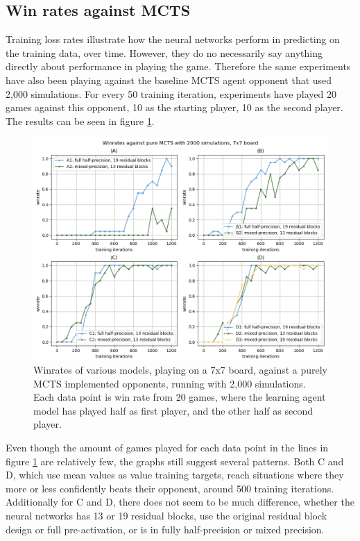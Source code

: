 \subsection{Win rates against MCTS}
Training loss rates illustrate how the neural networks perform in predicting on the training data, over time. However, they do no necessarily say anything directly about performance in playing the game. Therefore the same experiments have also been playing against the baseline MCTS agent opponent that used 2,000 simulations. For every 50 training iteration, experiments have played 20 games against this opponent, 10 as the starting player, 10 as the second player. The results can be seen in figure \ref{fig-win-7}.

\begin{figure}[ht]
	\centering
	\includegraphics[width=1\textwidth]{figures/winrates-7x7}
	\caption{Winrates of various models, playing on a 7x7 board, against a purely MCTS implemented opponents, running with 2,000 simulations. Each data point is win rate from 20 games, where the learning agent model has played half as first player, and the other half as second player.}
	\label{fig-win-7}
\end{figure}

Even though the amount of games played for each data point in the lines in figure \ref{fig-win-7} are relatively few, the graphs still suggest several patterns. Both C and D, which use mean values as value training targets, reach situations where they more or less confidently beats their opponent, around 500 training iterations. Additionally for C and D, there does not seem to be much difference, whether the neural networks has 13 or 19 residual blocks, use the original residual block design or full pre-activation, or is in fully half-precision or mixed precision.

